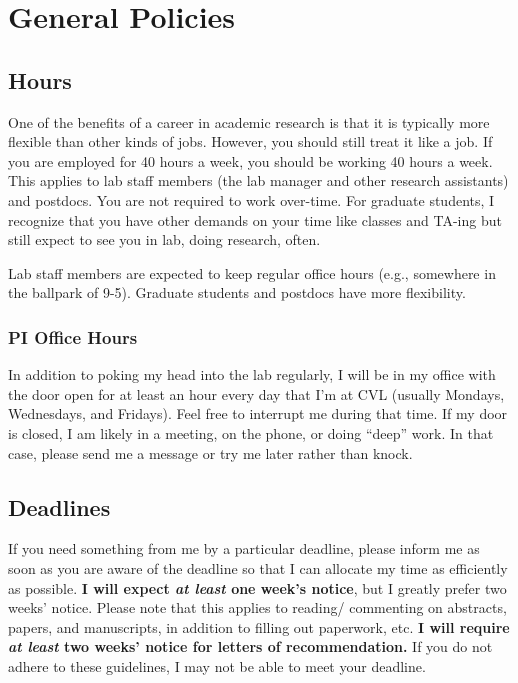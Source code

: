 \documentclass[]{book}
\begin{document}
\hypertarget{general-policies}{%
\chapter{General Policies}\label{general-policies}}

\hypertarget{hours}{%
\section{Hours}\label{hours}}

One of the benefits of a career in academic research is that it is typically more flexible than other kinds of jobs. However, you should still treat it like a job. If you are employed for 40 hours a week, you should be working 40 hours a week. This applies to lab staff members (the lab manager and other research assistants) and postdocs. You are not required to work over-time. For graduate students, I recognize that you have other demands on your time like classes and TA-ing but still expect to see you in lab, doing research, often.

Lab staff members are expected to keep regular office hours (e.g., somewhere in the ballpark of 9-5). Graduate students and postdocs have more flexibility.

\hypertarget{pi-office-hours}{%
\subsection{PI Office Hours}\label{pi-office-hours}}

In addition to poking my head into the lab regularly, I will be in my office with the door open for at least an hour every day that I'm at CVL (usually Mondays, Wednesdays, and Fridays). Feel free to interrupt me during that time. If my door is closed, I am likely in a meeting, on the phone, or doing ``deep'' work. In that case, please send me a message or try me later rather than knock.

\hypertarget{deadlines}{%
\section{Deadlines}\label{deadlines}}

If you need something from me by a particular deadline, please inform me as soon as you are aware of the deadline so that I can allocate my time as efficiently as possible. \textbf{I will expect \emph{at least} one week's notice}, but I greatly prefer two weeks' notice. Please note that this applies to reading/ commenting on abstracts, papers, and manuscripts, in addition to filling out paperwork, etc. \textbf{I will require \emph{at least} two weeks' notice for letters of recommendation.} If you do not adhere to these guidelines, I may not be able to meet your deadline.
\end{document}
